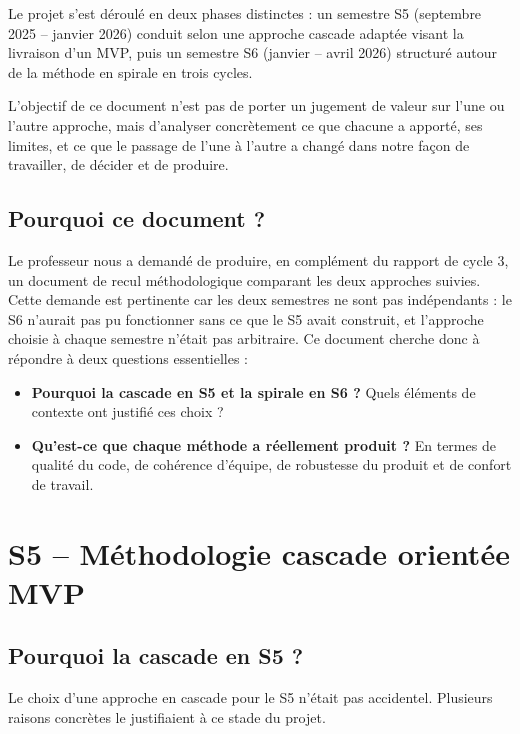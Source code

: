 \documentclass[11pt,a4paper]{report}
\begin{document}
Le projet s'est déroulé en deux phases distinctes : un semestre S5 (septembre 2025 -- janvier 2026) conduit selon une approche cascade adaptée visant la livraison d'un MVP, puis un semestre S6 (janvier -- avril 2026) structuré autour de la méthode en spirale en trois cycles.

L'objectif de ce document n'est pas de porter un jugement de valeur sur l'une ou l'autre approche, mais d'analyser concrètement ce que chacune a apporté, ses limites, et ce que le passage de l'une à l'autre a changé dans notre façon de travailler, de décider et de produire.

\section*{Pourquoi ce document ?}

Le professeur nous a demandé de produire, en complément du rapport de cycle 3, un document de recul méthodologique comparant les deux approches suivies. Cette demande est pertinente car les deux semestres ne sont pas indépendants : le S6 n'aurait pas pu fonctionner sans ce que le S5 avait construit, et l'approche choisie à chaque semestre n'était pas arbitraire. Ce document cherche donc à répondre à deux questions essentielles :

\begin{itemize}
    \item \textbf{Pourquoi la cascade en S5 et la spirale en S6 ?} Quels éléments de contexte ont justifié ces choix ?
    \item \textbf{Qu'est-ce que chaque méthode a réellement produit ?} En termes de qualité du code, de cohérence d'équipe, de robustesse du produit et de confort de travail.
\end{itemize}

\chapter{S5 -- Méthodologie cascade orientée MVP}

\section{Pourquoi la cascade en S5 ?}

Le choix d'une approche en cascade pour le S5 n'était pas accidentel. Plusieurs raisons concrètes le justifiaient à ce stade du projet.
\end{document}
